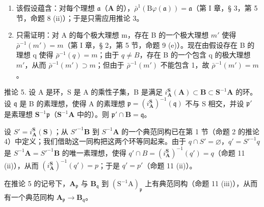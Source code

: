 \begin{enumerate}
\def\labelenumi{(\roman{enumi})}
\item
  该假设蕴含：对每个理想 \(\mathfrak{a}\)（\(\mathbf{A}\) 的），\(\bar{\rho}^{1}(\mathrm{B}\varphi (\mathfrak{a})) = \mathfrak{a}\)（第 I 章，§ 3，第 5 节，命题 8 (ii)）；于是只需应用推论 3。

\item
  只需证明：对 A 的每个极大理想 m，存在 B 的一个极大理想 \(m'\) 使得 \(\bar{\rho}^{-1}(m') = m\)（第 I 章，§ 2，第 5 节，命题 9 (e)）。现在由假设存在 B 的理想 q 使得 \(\bar{\rho}^{-1}(q) = m\)；由于 \(q \neq B\)，存在 B 的一个包含 q 的极大理想 \(m'\)，从而 \(\bar{\rho}^{-1}(m') \supset m\)；但由于 \(\bar{\rho}^{-1}(m')\) 不能包含 1，故 \(\bar{\rho}^{-1}(m') = m\)。
\end{enumerate}

推论 5. 设 A 是环，S 是 A 的乘性子集，B 是满足 \(i_{\mathbf{A}}^{\mathbf{S}}(\mathbf{A}) \subset \mathbf{B} \subset \mathbf{S}^{-1}\mathbf{A}\) 的环。设 \(\mathfrak{q}\) 是 B 的素理想，使得 A 的素理想 \(\mathfrak{p} = (i_{\mathbf{A}}^{\mathbf{S}})^{-1}(\mathfrak{q})\) 不与 S 相交，并设 \(\mathfrak{p}'\) 是素理想 \(\mathbf{S}^{-1}\mathfrak{p}\)（\(\mathbf{S}^{-1}\mathbf{A}\) 中的）。则 \(\mathfrak{p}' \cap \mathbf{B} = \mathfrak{q}\)。

设 \(S' = i_{\mathbf{A}}^{\mathbf{S}}(\mathbf{S})\)；从 \(S'^{-1}\mathbf{B}\) 到 \(S^{-1}\mathbf{A}\) 的一个典范同构已在第 1 节（命题 2 的推论 4）中定义；我们借助这一同构把这两个环等同起来。由于 \(q \cap S' = \varnothing\)，\(q' = S'^{-1}q\) 是 \(S^{-1}\mathbf{A} = S'^{-1}\mathbf{B}\) 的唯一素理想，使得 \(q' \cap B = (i_{\mathbf{A}}^{\mathbf{S}})^{-1}(q') = q\)（命题 11 (ii)），从而 \((i_{\mathbf{A}}^{\mathbf{S}})^{-1}(q') = p\)；于是 \(q' = p'\)（命题 11 (ii)）。

在推论 5 的记号下，\(\mathbf{A}_{\mathfrak{p}}\) 与 \(\mathbf{B}_{\mathfrak{q}}\) 到 \((\mathrm{S}^{-1}\mathrm{A})_{\mathfrak{p}}\) 上有典范同构（命题 11 (iii)），从而有一个典范同构 \(\mathbf{A}_{\mathfrak{p}} \to \mathbf{B}_{\mathfrak{q}}\)。

